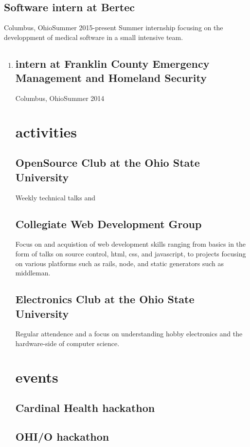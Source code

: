 \documentclass[12pt,letterpaper]{cv}
\begin{document}
		\subsection{Software intern at Bertec}{Columbus, Ohio}{Summer 2015-present}
			Summer internship focusing on the developpment of medical software in a small intensive team.
			\begin{enumerate}
				\item 
	
		\subsection{intern at Franklin County Emergency Management and Homeland Security}{Columbus, Ohio}{Summer 2014}

	\section{activities}
		\subsection{OpenSource Club at the Ohio State University}
			Weekly technical talks and 

		\subsection{Collegiate Web Development Group}
			Focus on and acquistion of web development skills ranging from basics in the form of talks on source control, html, css, and javascript, to projects focusing on various platforms such as rails, node, and static generators such as middleman.

		\subsection{Electronics Club at the Ohio State University}
			Regular attendence and a focus on understanding hobby electronics and the hardware-side of computer science.

	\section{events}
		\subsection{Cardinal Health hackathon}
			

		\subsection{OHI/O hackathon}
			


\end{enumerate}
\end{document}
